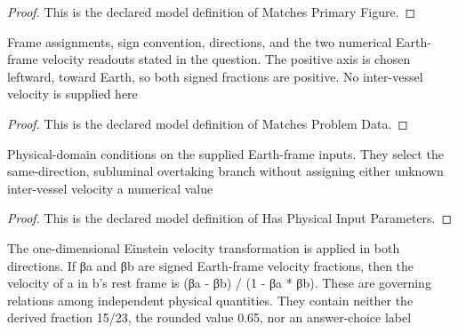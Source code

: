 \begin{proof}
  This is the declared model definition of Matches Primary Figure.
\end{proof}
\begin{definition}
  \label{def:physics:phyx-mini-0624:phyxminiproblems-problemphyxmini0624-matchesproblemdata}
  Frame assignments, sign convention, directions, and the two numerical Earth-frame velocity readouts stated in the question. The positive axis is chosen leftward, toward Earth, so both signed fractions are positive. No inter-vessel velocity is supplied here
\end{definition}
\begin{proof}
  This is the declared model definition of Matches Problem Data.
\end{proof}
\begin{definition}
  \label{def:physics:phyx-mini-0624:phyxminiproblems-problemphyxmini0624-hasphysicalinputparameters}
  Physical-domain conditions on the supplied Earth-frame inputs. They select the same-direction, subluminal overtaking branch without assigning either unknown inter-vessel velocity a numerical value
\end{definition}
\begin{proof}
  This is the declared model definition of Has Physical Input Parameters.
\end{proof}
\begin{definition}
  \label{def:physics:phyx-mini-0624:phyxminiproblems-problemphyxmini0624-satisfiesreciprocaleinsteinvelocitytransformations}
  The one-dimensional Einstein velocity transformation is applied in both directions. If βa and βb are signed Earth-frame velocity fractions, then the velocity of a in b's rest frame is (βa - βb) / (1 - βa * βb). These are governing relations among independent physical quantities. They contain neither the derived fraction 15/23, the rounded value 0.65, nor an answer-choice label
\end{definition}
